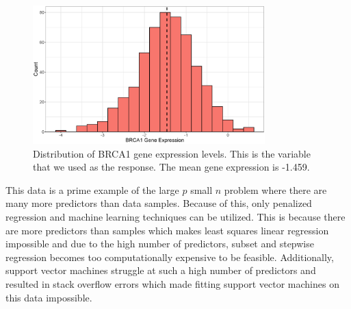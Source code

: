 \documentclass{article}
\begin{document}
	\begin{figure}[h!]
		\centering
		\includegraphics[width = 0.8\textwidth]{images/empirical_histogram.eps}
		\captionsetup{width = 0.8\textwidth}
		\caption{Distribution of BRCA1 gene expression levels. This is the variable that we used as the response. The mean gene expression is -1.459.}
		\label{fig:BRCA1-distribution}
	\end{figure}
	
	This data is a prime example of the large $p$ small $n$ problem where there are many more predictors than data samples. Because of this, only penalized regression and machine learning techniques can be utilized. This is because there are more predictors than samples which makes least squares linear regression impossible and due to the high number of predictors, subset and stepwise regression becomes too computationally expensive to be feasible. Additionally, support vector machines struggle at such a high number of predictors and resulted in stack overflow errors which made fitting support vector machines on this data impossible.
	
	
\end{document}
